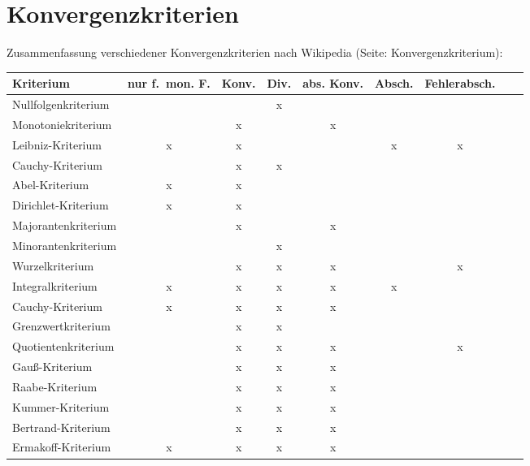 \documentclass[10pt]{report}
\begin{document}
    \section{Konvergenzkriterien}
    Zusammenfassung verschiedener Konvergenzkriterien nach Wikipedia (Seite: Konvergenzkriterium):
    \begin{center}
        \begin{tabular}{lcccccccp{2cm}}
             \toprule
             Kriterium & {nur f.\ mon. F.} & Konv. & Div. & abs. Konv. & Absch. & Fehlerabsch.\\
             \midrule
             Nullfolgenkriterium &  &  & x &  &  & \\
             Monotoniekriterium &  & x &  & x &  & \\
             Leibniz-Kriterium & x & x &  &  & x & x\\
             Cauchy-Kriterium &  & x & x &  &  & \\
             Abel-Kriterium & x & x &  &  &  & \\
             Dirichlet-Kriterium & x & x &  &  &  & \\
             Majorantenkriterium &  & x &  & x &  & \\
             Minorantenkriterium &  &  & x &  &  & \\
             Wurzelkriterium &  & x & x & x &  & x\\
             Integralkriterium & x & x & x & x & x & \\
             Cauchy-Kriterium & x & x & x & x &  & \\
             Grenzwertkriterium &  & x & x &  &  & \\
             Quotientenkriterium &  & x & x & x &  & x\\
             Gauß-Kriterium &  & x & x & x &  & \\
             Raabe-Kriterium &  & x & x & x &  & \\
             Kummer-Kriterium &  & x & x & x &  & \\
             Bertrand-Kriterium &  & x & x & x &  & \\
             Ermakoff-Kriterium & x & x & x & x &  & \\
             \bottomrule
        \end{tabular}
    \end{center}

    \pagebreak
\end{document}

